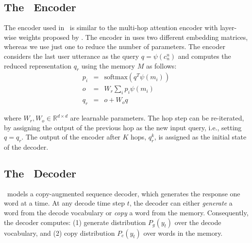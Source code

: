 
\subsection{The \sys\ Encoder}
\label{ssec:encoder}

The encoder used in \sys\ is similar to the multi-hop attention encoder with layer-wise weights proposed by \cite{sukhbaatar2015end}. The encoder in \cite{sukhbaatar2015end} uses two different embedding matrices, whereas we use just one to reduce the number of parameters. The encoder considers the last user utterance as the query $q=\psi(c_n^u)$ and computes the reduced representation $q_r$ using the memory $M$ as follows:
\begin{eqnarray}
p_i &=& \text{softmax}(q^T \psi(m_i)) \\
o &=& W_r \sum\nolimits_i p_i \psi(m_i) \\
q_r &=& o + W_o q
\end{eqnarray}

where $W_r, W_o \in \mathbb{R}^{d \times d}$ are learnable parameters. The hop step can be re-iterated, by assigning the output of the previous hop as the new input query, i.e., setting $q=q_r$. The output of the encoder after $K$ hops, $q_r^k$, is assigned as the initial state of the decoder.

\subsection{The \sys\ Decoder}
\label{ssec:decoder}

\sys\ models a copy-augmented sequence decoder, which generates the response one word at a time. At any decode time step $t$, the decoder can either \emph{generate} a word from the decode vocabulary or \emph{copy} a word from the memory. Consequently, the decoder computes: (1) generate distribution $P_g(y_t)$ over the decode vocabulary, and (2) copy distribution $P_c(y_t)$ over words in the memory. 

